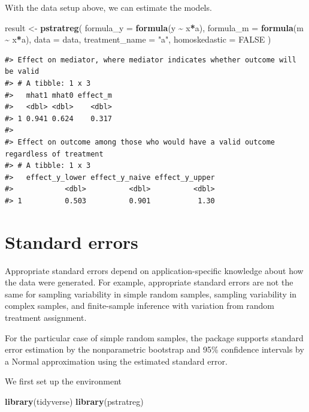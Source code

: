 \documentclass[
]{book}
\newenvironment{Shaded}{\begin{snugshade}}{\end{snugshade}}
\newcommand{\AttributeTok}[1]{\textcolor[rgb]{0.13,0.29,0.53}{#1}}
\newcommand{\ConstantTok}[1]{\textcolor[rgb]{0.56,0.35,0.01}{#1}}
\newcommand{\FunctionTok}[1]{\textcolor[rgb]{0.13,0.29,0.53}{\textbf{#1}}}
\newcommand{\NormalTok}[1]{#1}
\newcommand{\OtherTok}[1]{\textcolor[rgb]{0.56,0.35,0.01}{#1}}
\newcommand{\SpecialCharTok}[1]{\textcolor[rgb]{0.81,0.36,0.00}{\textbf{#1}}}
\newcommand{\StringTok}[1]{\textcolor[rgb]{0.31,0.60,0.02}{#1}}
\begin{document}
With the data setup above, we can estimate the models.

\begin{Shaded}
\begin{Highlighting}[]
\NormalTok{result }\OtherTok{\textless{}{-}} \FunctionTok{pstratreg}\NormalTok{(}
  \AttributeTok{formula\_y =} \FunctionTok{formula}\NormalTok{(y }\SpecialCharTok{\textasciitilde{}}\NormalTok{ x}\SpecialCharTok{*}\NormalTok{a),}
  \AttributeTok{formula\_m =} \FunctionTok{formula}\NormalTok{(m }\SpecialCharTok{\textasciitilde{}}\NormalTok{ x}\SpecialCharTok{*}\NormalTok{a),}
  \AttributeTok{data =}\NormalTok{ data,}
  \AttributeTok{treatment\_name =} \StringTok{"a"}\NormalTok{,}
  \AttributeTok{homoskedastic =} \ConstantTok{FALSE}
\NormalTok{)}
\end{Highlighting}
\end{Shaded}

\begin{verbatim}
#> Effect on mediator, where mediator indicates whether outcome will be valid
#> # A tibble: 1 x 3
#>   mhat1 mhat0 effect_m
#>   <dbl> <dbl>    <dbl>
#> 1 0.941 0.624    0.317
#> 
#> Effect on outcome among those who would have a valid outcome regardless of treatment
#> # A tibble: 1 x 3
#>   effect_y_lower effect_y_naive effect_y_upper
#>            <dbl>          <dbl>          <dbl>
#> 1          0.503          0.901           1.30
\end{verbatim}

\hypertarget{standard-errors}{%
\chapter{Standard errors}\label{standard-errors}}

Appropriate standard errors depend on application-specific knowledge about how the data were generated. For example, appropriate standard errors are not the same for sampling variability in simple random samples, sampling variability in complex samples, and finite-sample inference with variation from random treatment assignment.

For the particular case of simple random samples, the package supports standard error estimation by the nonparametric bootstrap and 95\% confidence intervals by a Normal approximation using the estimated standard error.

We first set up the environment

\begin{Shaded}
\begin{Highlighting}[]
\FunctionTok{library}\NormalTok{(tidyverse)}
\FunctionTok{library}\NormalTok{(pstratreg)}
\end{Highlighting}
\end{Shaded}
\end{document}
